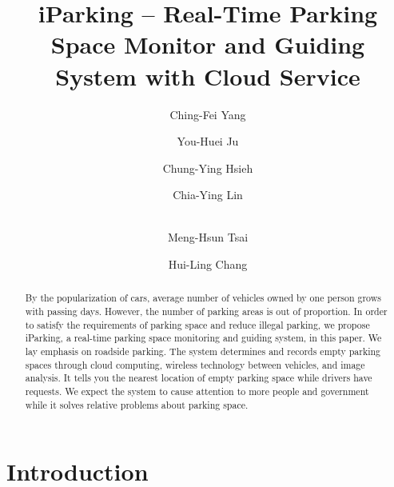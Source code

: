 \documentclass[runningheads,a4paper]{llncs}
\begin{document}


\title{iParking -- Real-Time Parking Space Monitor and Guiding System with Cloud Service}

\author{Ching-Fei Yang \and You-Huei Ju \and Chung-Ying Hsieh \and
Chia-Ying Lin \and \\ Meng-Hsun Tsai \and Hui-Ling Chang}
{}

\maketitle

\begin{abstract}
By the popularization of cars, average number of vehicles owned by one person
grows with passing days. However, the number of parking areas is out of
proportion. In order to satisfy the requirements of parking space and
reduce illegal parking, we propose iParking, a real-time parking space
monitoring and guiding system, in this paper. 
We lay emphasis on roadside parking. The system determines and records
empty parking spaces through cloud computing, wireless technology
between vehicles, and image analysis. It tells you the nearest location
of empty parking space while drivers have requests. We expect the system
to cause attention to more people and government while it solves relative
problems about parking space. 
\end{abstract}


\section{Introduction}\label{sec:intro}
\end{document}
